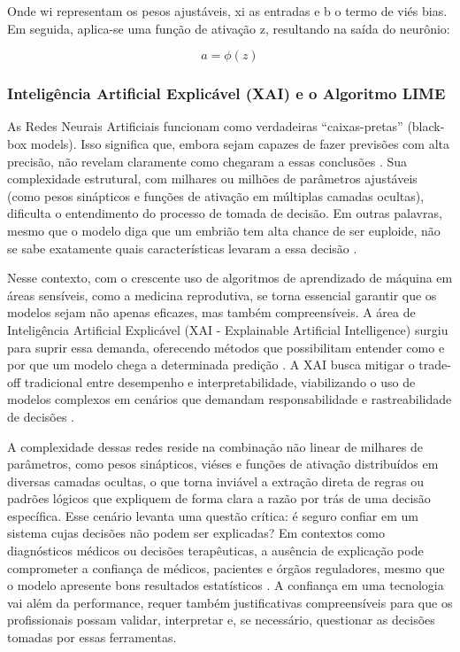 Onde wi representam os pesos ajustáveis, xi as entradas e b o termo de viés bias. Em seguida, aplica-se uma função de ativação z, resultando na saída do neurônio:

\begin{equation}
    a = \phi(z)
\end{equation}

\subsubsection{Inteligência Artificial Explicável (XAI) e o Algoritmo LIME}

As Redes Neurais Artificiais funcionam como verdadeiras “caixas-pretas” (black-box models). Isso significa que, embora sejam capazes de fazer previsões com alta precisão, não revelam claramente como chegaram a essas conclusões \cite{adadi2018}. Sua complexidade estrutural, com milhares ou milhões de parâmetros ajustáveis (como pesos sinápticos e funções de ativação em múltiplas camadas ocultas), dificulta o entendimento do processo de tomada de decisão. Em outras palavras, mesmo que o modelo diga que um embrião tem alta chance de ser euploide, não se sabe exatamente quais características levaram a essa decisão \cite{ribeiro2016}.

Nesse contexto, com o crescente uso de algoritmos de aprendizado de máquina em áreas sensíveis, como a medicina reprodutiva, se torna essencial garantir que os modelos sejam não apenas eficazes, mas também compreensíveis. A área de Inteligência Artificial Explicável (XAI {-} Explainable Artificial Intelligence) surgiu para suprir essa demanda, oferecendo métodos que possibilitam entender como e por que um modelo chega a determinada predição \cite{gilpin2018}. A XAI busca mitigar o trade-off tradicional entre desempenho e interpretabilidade, viabilizando o uso de modelos complexos em cenários que demandam responsabilidade e rastreabilidade de decisões \cite{gilpin2018}.

A complexidade dessas redes reside na combinação não linear de milhares de parâmetros, como pesos sinápticos, viéses e funções de ativação distribuídos em diversas camadas ocultas, o que torna inviável a extração direta de regras ou padrões lógicos que expliquem de forma clara a razão por trás de uma decisão específica. Esse cenário levanta uma questão crítica: é seguro confiar em um sistema cujas decisões não podem ser explicadas? Em contextos como diagnósticos médicos ou decisões terapêuticas, a ausência de explicação pode comprometer a confiança de médicos, pacientes e órgãos reguladores, mesmo que o modelo apresente bons resultados estatísticos \cite{gilpin2018}. A confiança em uma tecnologia vai além da performance, requer também justificativas compreensíveis para que os profissionais possam validar, interpretar e, se necessário, questionar as decisões tomadas por essas ferramentas.

